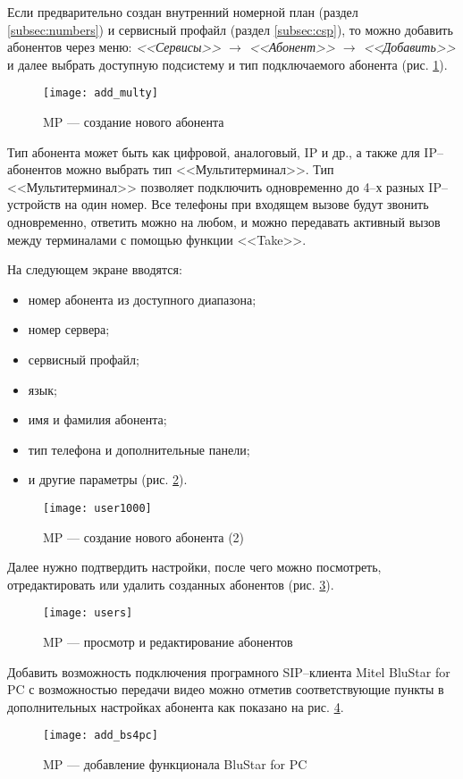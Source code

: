 Если предварительно создан внутренний номерной план (раздел \ref{subsec:numbers}) и сервисный профайл (раздел \ref{subsec:csp}), то можно добавить абонентов через меню: {\em <<Сервисы>> $\rightarrow$ <<Абонент>> $\rightarrow$ <<Добавить>>} и далее выбрать доступную подсистему и тип подключаемого абонента (рис. \ref{img:add_user}).
\begin{figure}[!ht]
  \center
  \texttt{[image: add\_multy]}
  \caption{MP --- создание нового абонента}
  \label{img:add_user}
\end{figure}

Тип абонента может быть как цифровой, аналоговый, IP и др., а также для IP--абонентов можно выбрать тип <<Мультитерминал>>. Тип <<Мультитерминал>> позволяет подключить одновременно до 4--х разных IP--устройств на один номер. Все телефоны при входящем вызове будут звонить одновременно, ответить можно на любом, и можно передавать активный вызов между терминалами с помощью функции <<Take>>.

На следующем экране вводятся:
\begin{itemize}
  \item номер абонента из доступного диапазона;
  \item номер сервера;
  \item сервисный профайл;
  \item язык;
  \item имя и фамилия абонента;
  \item тип телефона и дополнительные панели;
  \item и другие параметры (рис. \ref{img:user1000}).
\end{itemize}

\begin{figure}[!ht]
  \center
  \texttt{[image: user1000]}
  \caption{MP --- создание нового абонента (2)}
  \label{img:user1000}
\end{figure}
\clearpage

Далее нужно подтвердить настройки, после чего можно посмотреть, отредактировать или удалить созданных абонентов (рис. \ref{img:users}).
\begin{figure}[!ht]
  \center
  \texttt{[image: users]}
  \caption{MP --- просмотр и редактирование абонентов}
  \label{img:users}
\end{figure}

Добавить возможность подключения програмного SIP--клиента Mitel BluStar for PC с возможностью передачи видео можно отметив соответствующие пункты в дополнительных настройках абонента как показано на рис. \ref{img:add_bs4pc}.
\begin{figure}[!ht]
  \center
  \texttt{[image: add\_bs4pc]}
  \caption{MP --- добавление функционала BluStar for PC}
  \label{img:add_bs4pc}
\end{figure}


